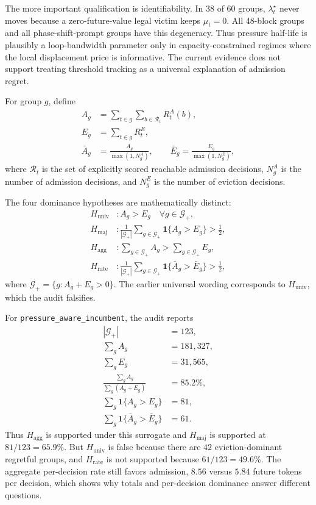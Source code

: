 \documentclass[11pt]{article}
\newcommand{\identifier}[1]{\nolinkurl{#1}}
\begin{document}
The more important qualification is identifiability.  In 38 of 60 groups,
\(\lambda_t^\star\) never moves because a zero-future-value legal victim keeps
\(\mu_t=0\).  All 48-block groups and all phase-shift-prompt groups have this
degeneracy.  Thus pressure half-life is plausibly a loop-bandwidth parameter only in
capacity-constrained regimes where the local displacement price is informative.
The current evidence does not support treating threshold tracking as a universal
explanation of admission regret.

For group \(g\), define
\begin{align}
  A_g &= \sum_{t\in g}\sum_{b\in\mathcal R_t}R^A_t(b),\\
  E_g &= \sum_{t\in g}R^E_t,\\
  \bar A_g &= \frac{A_g}{\max(1,N^A_g)},
  \qquad
  \bar E_g = \frac{E_g}{\max(1,N^E_g)},
\end{align}
where \(\mathcal R_t\) is the set of explicitly scored reachable admission decisions,
\(N^A_g\) is the number of admission decisions, and \(N^E_g\) is the number of eviction
decisions.

The four dominance hypotheses are mathematically distinct:
\begin{align}
  H_{\mathrm{univ}} &: A_g>E_g\quad\forall g\in\mathcal G_+,\\
  H_{\mathrm{maj}} &: \frac{1}{|\mathcal G_+|}
    \sum_{g\in\mathcal G_+}\mathbf 1\{A_g>E_g\}>\frac12,\\
  H_{\mathrm{agg}} &: \sum_{g\in\mathcal G_+}A_g>
    \sum_{g\in\mathcal G_+}E_g,\\
  H_{\mathrm{rate}} &: \frac{1}{|\mathcal G_+|}
    \sum_{g\in\mathcal G_+}\mathbf 1\{\bar A_g>\bar E_g\}>\frac12,
\end{align}
where \(\mathcal G_+=\{g:A_g+E_g>0\}\).  The earlier universal wording corresponds to
\(H_{\mathrm{univ}}\), which the audit falsifies.

For \identifier{pressure\_aware\_incumbent}, the audit reports
\begin{align}
  |\mathcal G_+| &= 123,\\
  \sum_g A_g &= 181{,}327,\\
  \sum_g E_g &= 31{,}565,\\
  \frac{\sum_g A_g}{\sum_g(A_g+E_g)} &= 85.2\%,\\
  \sum_g\mathbf 1\{A_g>E_g\} &= 81,\\
  \sum_g\mathbf 1\{\bar A_g>\bar E_g\} &= 61.
\end{align}
Thus \(H_{\mathrm{agg}}\) is supported under this surrogate and \(H_{\mathrm{maj}}\) is
supported at \(81/123=65.9\%\).  But \(H_{\mathrm{univ}}\) is false because there are
\(42\) eviction-dominant regretful groups, and \(H_{\mathrm{rate}}\) is not supported
because \(61/123=49.6\%\).  The aggregate per-decision rate still favors admission,
\(8.56\) versus \(5.84\) future tokens per decision, which shows why totals and
per-decision dominance answer different questions.
\end{document}
